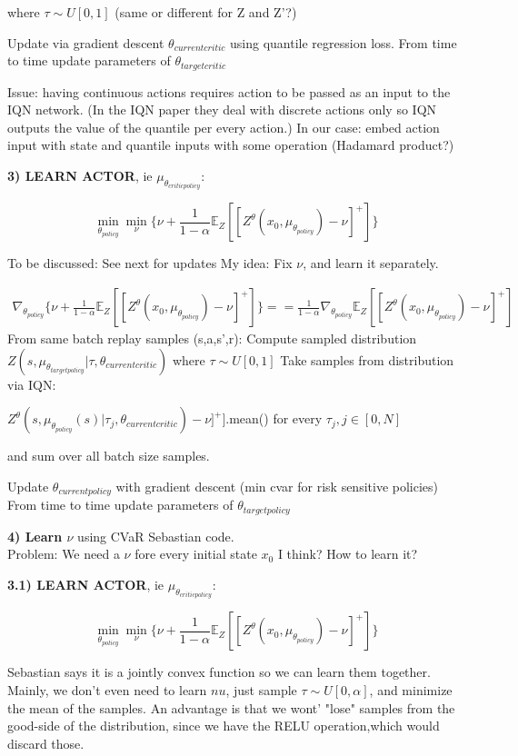 where $\tau  \sim U[0,1]$ (same or different for Z and Z'?)
        
Update via gradient descent $\theta_{currentcritic}$ using quantile regression loss.
From time to time update parameters of $\theta_{targetcritic}$ 

Issue: having continuous actions requires action to be passed as an input to the IQN network.
(In the IQN paper they deal with discrete actions only so IQN outputs the value of the quantile per every action.)
In our case: embed action input with state and quantile inputs with some operation (Hadamard product?)





\textbf{3) LEARN ACTOR}, ie $\mu_{\theta_{criticpolicy}}$:

 \begin{equation}
    \underset{\theta_{policy}} \min  \underset{\nu} \min \big\{\nu + \frac{1}{1-\alpha} \mathbb E_Z[[Z^\theta (x_0,\mu_{\theta_{policy}})- \nu]^+]\big\}
 \end{equation}

To be discussed: See next for updates
My idea:
Fix $\nu$, and learn it separately.

\begin{align}
    \nabla_{\theta_{policy}} \big\{\nu + \frac{1}{1-\alpha}
    \mathbb E_Z[[Z^\theta (x_0,\mu_{\theta_{policy}})- \nu]^+]\big\} =
    = \frac{1}{1-\alpha} \nabla_{\theta_{policy}}
    \mathbb E_Z[[Z^\theta (x_0,\mu_{\theta_{policy}})- \nu]^+]
\end{align}
From same batch replay samples (s,a,s',r):
Compute sampled distribution $Z(s,\mu_{\theta_{targetpolicy}} | \tau, \theta_{currentcritic})$
where $\tau  \sim U[0,1]$
Take samples from distribution via IQN:

$Z^\theta (s,\mu_{\theta_{policy}} (s) |\tau_j, \theta_{currentcritic})- \nu]^+]$.mean() for every $\tau_j, j \in [0,N]$

and sum over all batch size samples.


Update $\theta_{currentpolicy}$ with gradient descent (min cvar for risk sensitive policies)
From time to time update parameters of $\theta_{targetpolicy}$


\textbf{4) Learn $\nu$} using CVaR Sebastian code.\\
\color{red} {Problem: We need a $\nu$ fore every initial state $x_0$ I think? How to learn it? }


\color{black}
\textbf{3.1) LEARN ACTOR}, ie $\mu_{\theta_{criticpolicy}}$:

 \begin{equation}
    \underset{\theta_{policy}} \min  \underset{\nu} \min \big\{\nu + \frac{1}{1-\alpha} \mathbb E_Z[[Z^\theta (x_0,\mu_{\theta_{policy}})- \nu]^+]\big\}
 \end{equation}

Sebastian says it is a jointly convex function so we can learn them together.
Mainly, we don't even need to learn $nu$, just sample $\tau  \sim U[0,\alpha]$, and 
minimize the mean of the samples.
An advantage is that we wont' "lose" samples from the good-side of the distribution, since 
we have the RELU operation,which would discard those.
